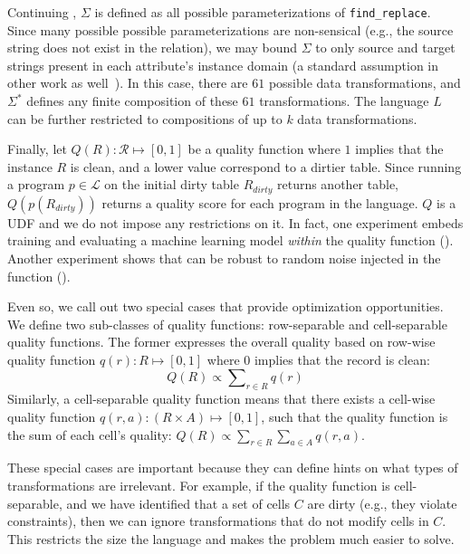 \begin{example}\label{ex2}
  Continuing , $\Sigma$ is defined as all possible parameterizations of \texttt{find\_replace}.  Since many possible possible parameterizations are non-sensical (e.g., the source string does not exist in the relation), we may bound $\Sigma$ to only source and target strings present in each attribute's instance domain (a standard assumption in other work as well~\cite{DBLP:series/synthesis/2012Fan}).  In this case, there are $61$ possible data transformations, and $\Sigma^*$ defines any finite composition of these $61$ transformations.  The language $L$ can be further restricted to compositions of up to $k$ data transformations.  
\end{example}

Finally, let $Q(R): \mathcal{R} \mapsto [0,1]$ be a quality function where $1$ implies that the instance $R$ is clean, and a lower value correspond to a dirtier table.
Since running a program $p\in\mathcal{L}$ on the initial dirty table $R_{dirty}$ returns another table, $Q(p(R_{dirty}))$ returns a quality score for each program in the language.  
$Q$ is a UDF and we do not impose any restrictions on it. In fact, one experiment embeds training and evaluating a machine learning model {\it within} the quality function ().  Another experiment shows that \sys can be robust to random noise injected in the function ().   

Even so, we call out two special cases that provide optimization opportunities. 
We define two sub-classes of quality functions: row-separable and cell-separable quality functions.
The former expresses the overall quality based on row-wise quality function $q(r): R \mapsto [0,1]$ where $0$ implies that the record is clean:
\[Q(R) \propto \sum\nolimits_{r \in R} q(r)\]
Similarly, a cell-separable quality function means that there exists a cell-wise quality function $q(r, a): (R\times A) \mapsto [0,1]$, such that the quality function is the sum of each cell's quality: 
$Q(R) \propto \sum\nolimits_{r \in R} \sum_{a \in A} q(r,a)$.

These special cases are important because they can define hints on what types of transformations are irrelevant.
For example, if the quality function is cell-separable, and we have identified that a set of cells $C$ are dirty (e.g., they violate constraints), then we can ignore transformations that do not modify cells in $C$.  This restricts the size the language and makes the problem much easier to solve.


